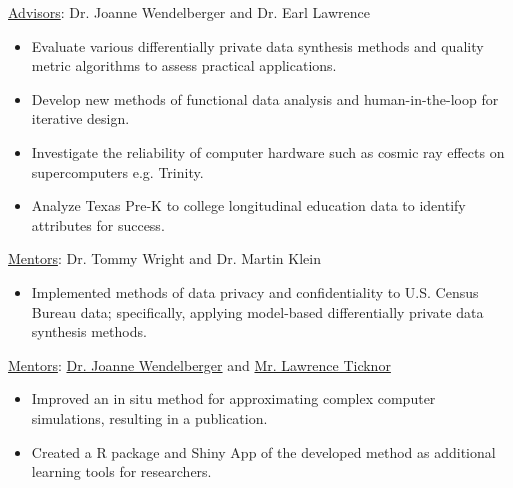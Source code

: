 \documentclass[11.5pt, letterpaper, roman]{moderncv} %
\begin{document}
\vspace{4pt}
{\underline{Advisors}: Dr. Joanne Wendelberger and Dr. Earl Lawrence
\begin{itemize}
    \item Evaluate various differentially private data synthesis methods and quality metric algorithms to assess practical applications.
    \item Develop new methods of functional data analysis and human-in-the-loop for iterative design.
    \item Investigate the reliability of computer hardware such as cosmic ray effects on supercomputers e.g. Trinity.
    \item Analyze Texas Pre-K to college longitudinal education data to identify attributes for success.
\end{itemize}}

\vspace{4pt}
{\underline{Mentors}: Dr. Tommy Wright and Dr. Martin Klein
\begin{itemize}
\item Implemented methods of data privacy and confidentiality to U.S. Census Bureau data; specifically, applying model-based differentially private data synthesis methods.
\end{itemize}}

\vspace{4pt}
{\underline{Mentors}:  \href{http://www.lanl.gov/expertise/profiles/view/joanne-wendelberger}{Dr. Joanne Wendelberger} and \href{http://www.lanl.gov/expertise/profiles/view/lawrence-ticknor}{Mr. Lawrence Ticknor}
\begin{itemize}
\item Improved an in situ method for approximating complex computer simulations, resulting in a publication.
\item Created a R package and Shiny App of the developed method as additional learning tools for researchers.
\end{itemize}}
\end{document}
